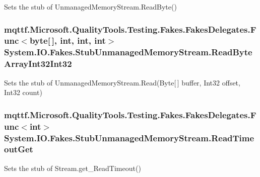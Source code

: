 Sets the stub of Unmanaged\-Memory\-Stream.\-Read\-Byte()

\hypertarget{class_system_1_1_i_o_1_1_fakes_1_1_stub_unmanaged_memory_stream_afa06cedcf634d93f1cb6eb8e2c5fa798}{
\subsubsection[{Read\-Byte\-Array\-Int32\-Int32}]{\setlength{\rightskip}{0pt plus 5cm}mqttf.\-Microsoft.\-Quality\-Tools.\-Testing.\-Fakes.\-Fakes\-Delegates.\-Func$<$byte\mbox{[}$\,$\mbox{]}, int, int, int$>$ System.\-I\-O.\-Fakes.\-Stub\-Unmanaged\-Memory\-Stream.\-Read\-Byte\-Array\-Int32\-Int32}}\label{class_system_1_1_i_o_1_1_fakes_1_1_stub_unmanaged_memory_stream_afa06cedcf634d93f1cb6eb8e2c5fa798}


Sets the stub of Unmanaged\-Memory\-Stream.\-Read(\-Byte\mbox{[}$\,$\mbox{]} buffer, Int32 offset, Int32 count)

\hypertarget{class_system_1_1_i_o_1_1_fakes_1_1_stub_unmanaged_memory_stream_a1ed354c6cd3a52ecd363cc880219b6f6}{
\subsubsection[{Read\-Timeout\-Get}]{\setlength{\rightskip}{0pt plus 5cm}mqttf.\-Microsoft.\-Quality\-Tools.\-Testing.\-Fakes.\-Fakes\-Delegates.\-Func$<$int$>$ System.\-I\-O.\-Fakes.\-Stub\-Unmanaged\-Memory\-Stream.\-Read\-Timeout\-Get}}\label{class_system_1_1_i_o_1_1_fakes_1_1_stub_unmanaged_memory_stream_a1ed354c6cd3a52ecd363cc880219b6f6}


Sets the stub of Stream.\-get\-\_\-\-Read\-Timeout()

